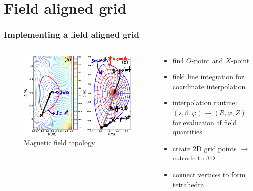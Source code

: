 \documentclass{beamer}
\begin{document}
\section{Field aligned grid}
\begin{frame}
\frametitle{Implementing a field aligned grid}
\vspace{-1 cm}
\begin{columns}[onlytextwidth]
	\begin{column}{0.5\textwidth}
		\begin{center}
			\begin{figure}
				\includegraphics[trim={0 0cm 0 0cm},clip,width=1\textwidth]{FIGURES/magnetic_field_labeled.jpg}
\caption{Magnetic field topology}
			\end{figure}
		\end{center}
	\end{column}
	\begin{column}{0.5\textwidth}
		\vspace{0 cm}
		\begin{center}
			\begin{itemize}

				\item find $O$-point and $X$-point
				\item field line integration for coordinate interpolation
				\item interpolation routine: $(s,\vartheta,\varphi)\rightarrow (R,\varphi,Z)$ for evaluation of field quantities
				\item create 2D grid points \newline $\rightarrow$ extrude to 3D
				\item connect vertices to form tetrahedra
			\end{itemize}
		\end{center}
	\end{column}
\end{columns}
\end{frame}
\end{document}
